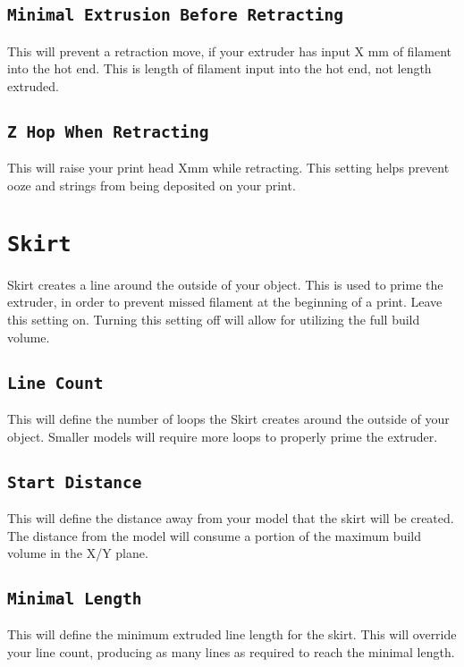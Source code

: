 \subsection{\texttt{Minimal Extrusion Before Retracting}}
This will prevent a retraction move, if your extruder has input X mm of filament into the hot end. This is length of filament input into the hot end, not length extruded.

\subsection{\texttt{Z Hop When Retracting}}
This will raise your print head Xmm while retracting. This setting helps prevent ooze and strings from being deposited on your print. 

\section{\texttt{Skirt}}
Skirt creates a line around the outside of your object. This is used to prime the extruder, in order to prevent missed filament at the beginning of a print. Leave this setting on. Turning this setting off will allow for utilizing the full build volume.

\subsection{\texttt{Line Count}}
This will define the number of loops the Skirt creates around the outside of your object. Smaller models will require more loops to properly prime the extruder.

\subsection{\texttt{Start Distance}}
This will define the distance away from your model that the skirt will be created. The distance from the model will consume a portion of the maximum build volume in the X/Y plane.

\subsection{\texttt{Minimal Length}}
This will define the minimum extruded line length for the skirt. This will override your line count, producing as many lines as required to reach the minimal length.

